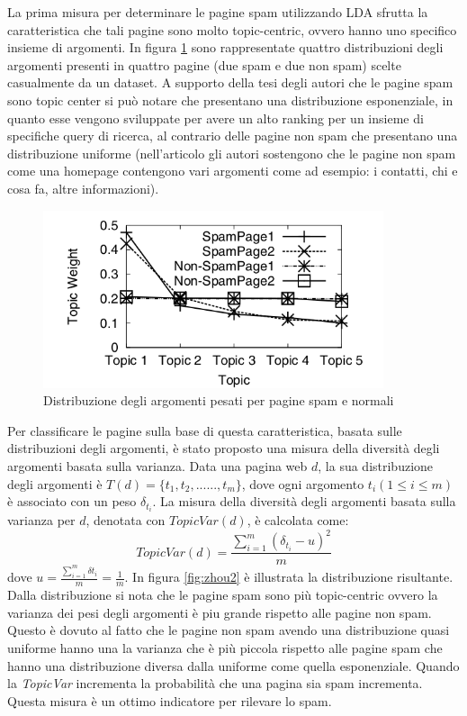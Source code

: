 La prima misura per determinare le pagine spam utilizzando LDA sfrutta la caratteristica che tali pagine sono molto topic-centric, ovvero hanno uno specifico insieme di argomenti. In figura \ref{fig:zhou1} sono rappresentate quattro distribuzioni degli argomenti presenti in quattro pagine (due spam e due non spam) scelte casualmente da un dataset. A supporto della tesi degli autori che le pagine spam sono topic center si può notare che presentano una distribuzione esponenziale, in quanto esse vengono sviluppate per avere un alto ranking per un insieme di  specifiche query di ricerca, al contrario delle pagine non spam che presentano una distribuzione uniforme (nell'articolo gli autori sostengono che le pagine non spam come una homepage contengono vari argomenti come ad esempio: i contatti, chi e cosa fa, altre informazioni).
\begin{figure}
\centering
\includegraphics[width=10cm]{immagini/zhou/immagine1.png}
\caption{Distribuzione degli argomenti pesati per pagine spam e normali}
\label{fig:zhou1}
\end{figure}
Per classificare le pagine sulla base di questa caratteristica, basata sulle distribuzioni degli argomenti, è stato proposto una misura della  diversità degli argomenti basata sulla varianza. Data una pagina web \(d\), la sua distribuzione degli argomenti è \(T(d)=\{t_1,t_2,......,t_m\}\), dove ogni argomento \(t_i (1 \leq i \leq m)\) è associato con un peso \(\delta_{t_i}\). La misura della diversità degli argomenti basata sulla varianza per \(d\), denotata con \(TopicVar(d)\), è calcolata come:
\begin{equation}
TopicVar(d)=\frac{\sum_{i=1}^m (\delta_{t_i}-u)^2}{m}
\end{equation}
dove \(u=\frac{\sum_{i=1}^m\delta{t_i}}{m}=\frac{1}{m}\).
In figura \ref{fig:zhou2} è illustrata la distribuzione risultante. Dalla distribuzione si nota che le pagine spam sono più topic-centric ovvero la varianza dei pesi degli argomenti è piu grande rispetto alle pagine non spam. Questo è dovuto al fatto che le pagine non spam avendo una distribuzione quasi uniforme hanno una la varianza che è più piccola rispetto alle pagine spam che hanno una distribuzione diversa dalla uniforme come quella esponenziale. Quando la \textit{TopicVar} incrementa la probabilità che una pagina sia spam incrementa. Questa misura è un ottimo indicatore per rilevare lo spam.

